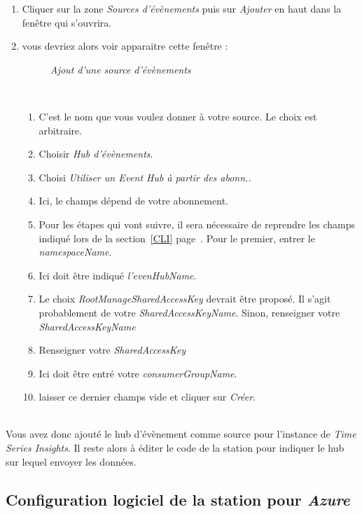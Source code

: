 \begin{enumerate}
	\item Cliquer sur la zone \textit{Sources d'évènements} puis sur \textit{Ajouter} en haut dans la fenêtre qui s'ouvrira.
	\item vous devriez alors voir apparaitre cette fenêtre : 
	\begin{figure}[H]
\begin{center}
\end{center}
	\caption{ \textit{Ajout d'une source d'évènements}}
\end{figure}\\
	\begin{enumerate}
	\item C'est le nom que vous voulez donner à votre source. Le choix est arbitraire.
	\item Choisir \textit{Hub d'évènements}.
	\item Choisi \textit{Utiliser un Event Hub à partir des abonn..}
	\item Ici, le champs dépend de votre abonnement.
	\item Pour les étapes qui vont suivre, il sera nécessaire de reprendre les champs indiqué lors de la section~\ref{CLI} page~\pageref{CLI}. Pour le premier, entrer le \textit{namespaceName}.
	\item Ici doit être indiqué \textit{l'evenHubName}.
	\item Le choix \textit{RootManageSharedAccessKey} devrait être proposé. Il s'agit probablement de votre \textit{SharedAccessKeyName}. Sinon, renseigner votre \textit{SharedAccessKeyName}
	\item Renseigner votre \textit{SharedAccessKey}
	\item Ici doit être entré votre \textit{consumerGroupName}.
	\item laisser ce dernier champs vide et cliquer sur \textit{Créer}.
	\end{enumerate}
\end{enumerate}\\

Vous avez donc ajouté le hub d'évènement comme source pour l'instance de \textit{Time Series Insights}. Il reste alors à éditer le code de la station pour indiquer le hub sur lequel envoyer les données.


\subsection{Configuration logiciel de la station pour \textit{Azure}}

